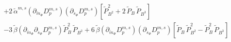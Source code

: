 \begin{align}
                       & + 2\,\tilde \alpha^{m,s} \left( \partial_{\breve m_{\Phi}} D_p^{m,s} \right)\left( \partial_{\breve s_{\Phi}} D_p^{m,s} \right)
                         \left[ \tilde P_{B^2}^2 + 2\, \tilde P_B\, \tilde P_{B^3} \right]
      \nonumber \\
                       & - 3\, \tilde \beta \left( \partial_{\breve m_{\Phi}}\partial_{\breve s_{\Phi}} D_p^{m,s} \right) \tilde P_B^2\,  \tilde P_{B^2}
                         + 6\, \tilde \beta \left( \partial_{\breve m_{\Phi}} D_p^{m,s} \right)\left( \partial_{\breve s_{\Phi}} D_p^{m,s} \right)
                         \left[ \tilde P_B\,  \tilde P_{B^2}^2 - \tilde P_B^2\,  \tilde P_{B^3} \right]
\end{align}

